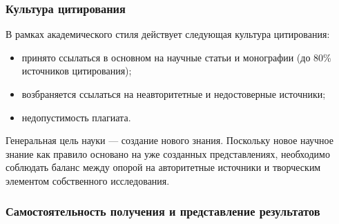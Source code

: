 \subsubsection{Культура цитирования}

В рамках академического стиля действует следующая культура цитирования: 
\begin{itemize}
    \item принято ссылаться в основном на научные статьи и монографии (до 80\% источников цитирования);
    \item возбраняется ссылаться на неавторитетные и недостоверные источники;
    \item недопустимость плагиата.
\end{itemize}

Генеральная цель науки --- создание нового знания. 
Поскольку новое научное знание  как правило основано на уже созданных представлениях, необходимо соблюдать баланс между опорой на авторитетные источники и творческим элементом собственного исследования. 

\subsubsection{Самостоятельность получения и представление результатов}




